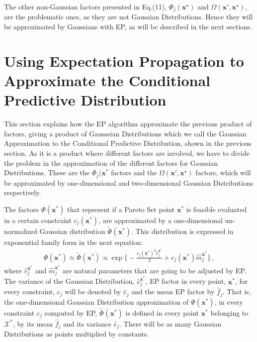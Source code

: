 \documentclass[review,preprint,12pt]{elsarticle}
\begin{document}
The other non-Gaussian factors presented in Eq.(11), $\Phi_j(\textbf{x}^{\star})$ and  $\Omega(\textbf{x}',\textbf{x}^{\star})$, are the problematic ones, as they are not Gaussian Distributions. Hence they will be approximated by Gaussians with EP, as will be described in the next sections.

\section{Using Expectation Propagation to Approximate the Conditional Predictive Distribution}

This section explains how the EP algorithm approximate the previous product of factors, giving a product of Gausssian Distributions which we call the Gaussian Approximation to the Conditional Predictive Distribution, shown in the previous section. As it is a product where different factors are involved, we have to divide the problem in the approximation of the different factors for Gaussian Distributions. These are the $\Phi_j(\boldsymbol{x}^*$ factors and the $\Omega(\textbf{x}',\textbf{x}^{\star})$ factors, which will be approximated by one-dimensional and two-dimensional Gaussian Distributions respectively.

The factors $\Phi(\boldsymbol{x}^*)$ that represent if a Pareto Set point $\boldsymbol{x}^*$ is feasible evaluated in a certain constraint $c_j(\boldsymbol{x}^*)$, are approximated by a one-dimensional un-normalized Gaussian distribution $\tilde{\Phi}(\boldsymbol{x}^*)$. This distribution is expressed in exponential family form in the next equation:
\begin{align}
    \Phi(\boldsymbol{x}^*) \approx \tilde{\Phi}(\boldsymbol{x}^*) \propto \exp\bigg\{ - \frac{c_j(\boldsymbol{x}^{*})^{2}\hat{v}_{j}^{\boldsymbol{x}^{*}}}{2} + c_j(\boldsymbol{x}^*)\hat{m}_{j}^{\boldsymbol{x}^*}\bigg\}\,,
\end{align}
where $\hat{v}_{j}^{\boldsymbol{x}^{*}}$ and $\hat{m}_{j}^{\boldsymbol{x}^*}$ are natural parameters that are going to be adjusted by EP. The variance of the Gaussian Distribution, $\hat{v}_{j}^{\boldsymbol{x}^{*}}$, EP factor in every point, $\boldsymbol{x}^*$, for every constraint, $c_j$ will be denoted by $\hat{e}_{j}$ and the mean EP factor by $\hat{f}_{j}$. That is, the one-dimensional Gaussian Distribution approximation of ${\Phi}(\boldsymbol{x}^*)$, in every constraint $c_j$ computed by EP, $\tilde{\Phi}(\boldsymbol{x}^*)$ is defined in every point $\boldsymbol{x}^*$ belonging to $\mathcal{X}^*$, by its mean $\hat{f}_{j}$ and its variance $\hat{e}_{j}$. There will be as many Gaussian Distributions as points multiplied by constants.
\end{document}
